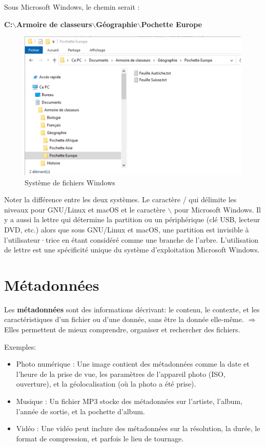 \documentclass[11pt, a4paper]{book}
\begin{document}
Sous Microsoft Windows, le chemin serait :

\begin{center}
{\bf C:$\backslash$Armoire de classeurs$\backslash$Géographie$\backslash$Pochette Europe
}
\end{center}

\begin{figure}[ht!]
\centering
\includegraphics[width=0.7\linewidth]{images/fichierWindows}
    \caption{Système de fichiers Windows}
\end{figure}

Noter la différence entre les deux systèmes. Le caractère / qui délimite les niveaux pour GNU/Linux et macOS et le caractère $\backslash$ pour Microsoft Windows. Il y a aussi la lettre qui détermine la partition ou un périphérique (clé USB, lecteur DVD, etc.) alors que sous GNU/Linux et macOS, une partition est invisible à l’utilisateur·trice en étant considéré comme une branche de l’arbre. L'utilisation de lettre est une spécificité unique du système d'exploitation Microsoft Windows.

\section{Métadonnées}

Les \textbf{métadonnées} sont des informations décrivant: le contenu, le contexte, et les caractéristiques d'un fichier ou d'une donnée, sans être la donnée elle-même.
$\Rightarrow$ Elles permettent de mieux comprendre, organiser et rechercher des fichiers.

Exemples:
\begin{itemize}
    \item Photo numérique : Une image contient des métadonnées comme la date et l'heure de la prise de vue, les paramètres de l'appareil photo (ISO, ouverture), et la géolocalisation (où la photo a été prise).
    \item Musique : Un fichier MP3 stocke des métadonnées sur l'artiste, l'album, l'année de sortie, et la pochette d'album.
    \item Vidéo : Une vidéo peut inclure des métadonnées sur la résolution, la durée, le format de compression, et parfois le lieu de tournage.
\end{itemize}
\end{document}
